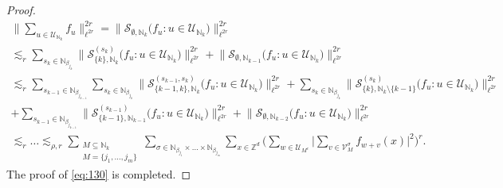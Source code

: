 \documentclass[a4paper,oneside]{amsart}
\theoremstyle{plain}
\theoremstyle{definition}
\numberwithin{equation}{section}
\theoremstyle{plain}
\newcommand{\ZZ}{\mathbb{Z}}
\newcommand{\NN}{\mathbb{N}}
\renewcommand{\atop}[2]{\substack{{#1}\\{#2}}}
\newcommand{\8}{\infty}
\begin{document}
\begin{proof}
\begin{multline}
  \label{eq:131}
\Big\|\sum_{u\in\mathcal U_{\NN_k}}
  f_{u}\Big\|_{\ell^{2r}}^{2r}=\big\|\mathcal S_{\emptyset,
    \NN_k}\big(f_u: u\in\mathcal
  U_{\NN_k}\big)\big\|_{\ell^{2r}}^{2r}\\
\lesssim _r  
\sum_{s_{k}\in\NN_{\beta_{j_k}}}
 \big\|\mathcal S_{\{k\}, \NN_k}^{(s_{k})}\big(f_u:u\in\mathcal
  U_{\NN_k}\big)
\big\|_{\ell^{2r}}^{2r}
+\big\|\mathcal S_{\emptyset, \NN_{k-1}}\big(f_u:u\in\mathcal
  U_{\NN_k}\big)
\big\|_{\ell^{2r}}^{2r}\\
\lesssim_r
\sum_{s_{k-1}\in\NN_{\beta_{j_{k-1}}}}\sum_{s_{k}\in\NN_{\beta_{j_k}}}
 \big\|\mathcal S_{\{k-1, k\}, \NN_k}^{(s_{k-1}, s_{k})}\big(f_u:u\in\mathcal
  U_{\NN_k}\big)
\big\|_{\ell^{2r}}^{2r}+
\sum_{s_{k}\in\NN_{\beta_{j_k}}}
 \big\|\mathcal S_{\{k\}, \NN_{k}\setminus\{k-1\}}^{(s_{k})}\big(f_u:u\in\mathcal
  U_{\NN_k}\big)
\big\|_{\ell^{2r}}^{2r}\\
+\sum_{s_{k-1}\in\NN_{\beta_{j_{k-1}}}}
 \big\|\mathcal S_{\{k-1\}, \NN_{k-1}}^{(s_{k-1})}\big(f_u:u\in\mathcal
  U_{\NN_k}\big)
\big\|_{\ell^{2r}}^{2r}
+\big\|\mathcal S_{\emptyset, \NN_{k-2}}\big(f_u:u\in\mathcal
  U_{\NN_k}\big)
\big\|_{\ell^{2r}}^{2r}\\
\lesssim_r\ldots\lesssim_{\rho, r}\sum_{\atop{M\subseteq \NN_k}{M=\{j_1, \ldots,
    j_m\}}}\sum_{\sigma\in\NN_{\beta_{j_1}}\times\ldots\times\NN_{\beta_{j_m}}}
\sum_{x\in\ZZ^d}\bigg(\sum_{w\in\mathcal
  U_{M^c}}\Big|\sum_{v\in\mathcal V_{M}^{\sigma}}f_{w+v}(x)\Big|^2\bigg)^r.
\end{multline}
 The proof of \eqref{eq:130} is completed.
\end{proof}
\end{document}
